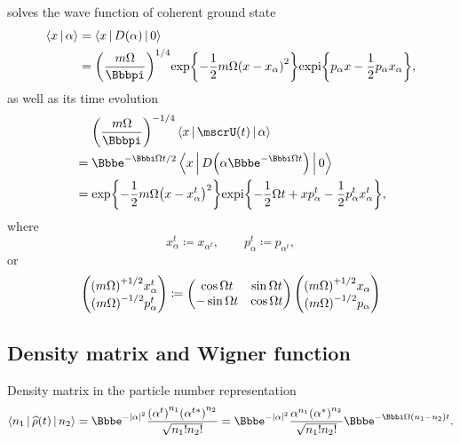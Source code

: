  solves the wave function of coherent ground state
\begin{align}
\Braket{x | \alpha} &= \Braket{x | \rfun{D}{\alpha} | 0}
\nonumber \\
&= \rbr{\frac{m\Omega}{\pp}}^{1/4} \cfun{\exp}%
{-\frac{1}{2}m\Omega\rbr{x-x_\alpha}^2}\cfun{\expi}{p_\alpha x - \frac{1}{2} 
p_\alpha x_\alpha},
\end{align}
as well as its time evolution
\begin{align}
&\phantom{{}={}}\rbr{\frac{m\Omega}{\pp}}^{-1/4}\Braket{x | \rfun{\mscrU}{t} | 
\alpha} \nonumber \\
&=\ee^{-\ii\Omega t/2}
\Braket{x | \rfun{D}{\alpha\ee^{-\ii\Omega t}} | 0}
\nonumber \\
&=\cfun{\exp}{-\frac{1}{2}m\Omega\rbr{x-x_\alpha^t}^2} 
\cfun{\expi}{-\frac{1}{2}\Omega t + x p_\alpha^t
- \frac{1}{2} p_\alpha^t x_\alpha^t},
\end{align}
where
\begin{equation}
x_\alpha^t \coloneqq x_{\alpha^t},\qquad
p_\alpha^t \coloneqq p_{\alpha^t},
\end{equation}
or
\begin{equation}
\begin{pmatrix} {\left(m\Omega\right)}^{+1/2} x_\alpha^t \\
{\left(m\Omega\right)}^{-1/2} p_\alpha^t \end{pmatrix} \coloneqq
\begin{pmatrix}
\cos\Omega t & \sin\Omega t \\ -\sin\Omega t & \cos\Omega t
\end{pmatrix}
\begin{pmatrix} {\left(m\Omega\right)}^{+1/2} x_\alpha \\
{\left(m\Omega\right)}^{-1/2} p_\alpha\end{pmatrix}
\end{equation}

\subsection{Density matrix and Wigner function}

\begin{nameddef}{Density matrix in the particle number representation}
\begin{equation}
\Braket{n_1 | \rfun{\widehat{\rho}}{t} | n_2} = \ee^{-\vbr{\alpha}^2}
\frac{\rbr{\alpha^t}^{n_1} \rbr{\alpha^t{}^*}^{n_2}}{\sqrt{n_1!n_2!}}
= \ee^{-\vbr{\alpha}^2} \frac{\alpha^{n_1} 
\rbr{\alpha^*}^{n_2}}{\sqrt{n_1!n_2!}}\ee^{-\ii\Omega\rbr{n_1-n_2}t}.
\end{equation}

\end{nameddef} %



